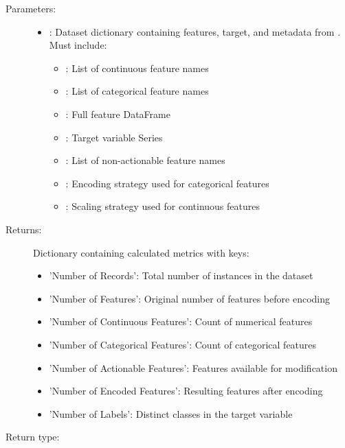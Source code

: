 \begin{description}
    \item[Parameters:]
        \begin{itemize}
            \item {}: Dataset dictionary containing features, target, and metadata from . Must include:
                \begin{itemize}
                    \item {}: List of continuous feature names
                    \item {}: List of categorical feature names
                    \item {}: Full feature DataFrame
                    \item {}: Target variable Series
                    \item {}: List of non-actionable feature names
                    \item {}: Encoding strategy used for categorical features
                    \item {}: Scaling strategy used for continuous features
                \end{itemize}
        \end{itemize}
    \item[Returns:] Dictionary containing calculated metrics with keys:
        \begin{itemize}
            \item 'Number of Records': Total number of instances in the dataset
            \item 'Number of Features': Original number of features before encoding
            \item 'Number of Continuous Features': Count of numerical features
            \item 'Number of Categorical Features': Count of categorical features
            \item 'Number of Actionable Features': Features available for modification
            \item 'Number of Encoded Features': Resulting features after encoding
            \item 'Number of Labels': Distinct classes in the target variable
        \end{itemize}
    \item[Return type:] 
\end{description}

